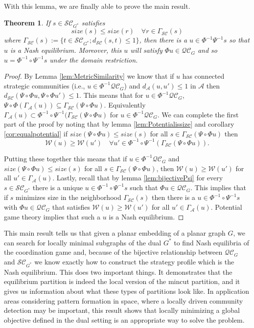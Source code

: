 \documentclass{article}
\newtheorem{theorem}{Theorem}[section]
\begin{document}
    With this lemma, we are finally able to prove the main result.
    \begin{theorem}\label{thm:minimalSubgraphs}
    If $s\in \mathcal{SC}_{G^*}$ satisfies \[size(s)\leq size(r)\quad \forall r\in \Gamma_{\mathcal{SC}}(s)\]
    where $\Gamma_{\mathcal{SC}}(s):=\{t\in \mathcal{SC}_{G^*};d_{\mathcal{SC}}(s,t)\leq 1\}$,
    then there is a $u\in \Phi^{-1}\Psi^{-1}s$ so that $u$ is a Nash equilibrium. Moreover, this $u$ will satisfy $\Phi u\in \mathcal{QC}_G$ and so $u=\Phi^{-1}\circ\Psi^{-1}s$ under the domain restriction. 
    \end{theorem}

    \begin{proof}
    By Lemma \ref{lem:MetricSimilarity} we know that if $u$ has connected strategic communities (i.e., $u\in \Phi^{-1}\mathcal{QC}_G$) and  $d_{\mathcal{A}}(u,u')\leq 1$ in $\mathcal{A}$ then $d_{\mathcal{SC}}(\Psi\circ \Phi u,\Psi\circ\Phi u')\leq 1$. This means that for $u\in \Phi^{-1}\mathcal{QC}_G$, $\Psi\circ\Phi(\Gamma_\mathcal{A}(u))\subseteq\Gamma_{\mathcal{SC}}(\Psi\circ \Phi u)$.  Equivalently $\Gamma_\mathcal{A}(u)\subset \Phi^{-1}\circ\Psi^{-1}(\Gamma_{\mathcal{SC}}(\Psi\circ\Phi u)$ for  $u\in\Phi^{-1}\mathcal{QC}_G$.  We can complete the first part of the proof by noting that by lemma \ref{lem:Potentialissize} and corollary \ref{cor:equalpotential} if $size(\Psi\circ\Phi u)\leq size(s)$ for all $s\in \Gamma_{\mathcal{SC}}(\Psi\circ\Phi u)$ then \[\mathcal{W}(u)\geq \mathcal{W}(u')\quad \forall u'\in \Phi^{-1}\circ\Psi^{-1}(\Gamma_{\mathcal{SC}}(\Psi\circ\Phi u)).\] 

    Putting these together this means that if $u\in  \Phi^{-1}\mathcal{QC}_G$ and $size(\Psi\circ\Phi u)\leq size(s)$ for all $s\in \Gamma_{\mathcal{SC}}(\Psi\circ\Phi u)$,  then $\mathcal{W}(u)\geq \mathcal{W}(u')$ for all $u'\in \Gamma_{\mathcal{A}}(u)$. Lastly, recall that by lemma \ref{lem:bijectivePsi} for every $s\in \mathcal{SC}_{G^*}$ there is a unique $u\in \Phi^{-1}\circ\Psi^{-1}s$ such that $\Phi u\in \mathcal{QC}_G$. This implies that if $s$ minimizes size in the neighborhood $\Gamma_{\mathcal{SC}}(s)$ then there is a $u\in \Phi^{-1}\circ\Psi^{-1} s$ with $\Phi u\in \mathcal{QC}_G$ that satisfies $\mathcal{W}(u)\geq \mathcal{W}(u')$ for all $u'\in \Gamma_\mathcal{A}(u)$. Potential game theory implies that such a $u$ is a Nash equilibrium. 
    \end{proof}

    This main result tells us that given a planar embedding of a planar graph $G$, we can search for locally minimal subgraphs of the dual $G^*$ to find Nash equilibria of the coordination game and, because of the bijective relationship between $\mathcal{QC}_G$ and $\mathcal{SC}_{G^*}$ we know exactly how to construct the strategy profile which is the Nash equilibrium. This does two important things. It demonstrates that the equilibrium partition is indeed the local version of the mincut partition, and it gives us information about what these types of partitions look like. In application areas considering pattern formation in space, where a locally driven community detection may be important, this result shows that locally minimizing a global objective defined in the dual setting is an appropriate way to solve the problem. 
\end{document}
